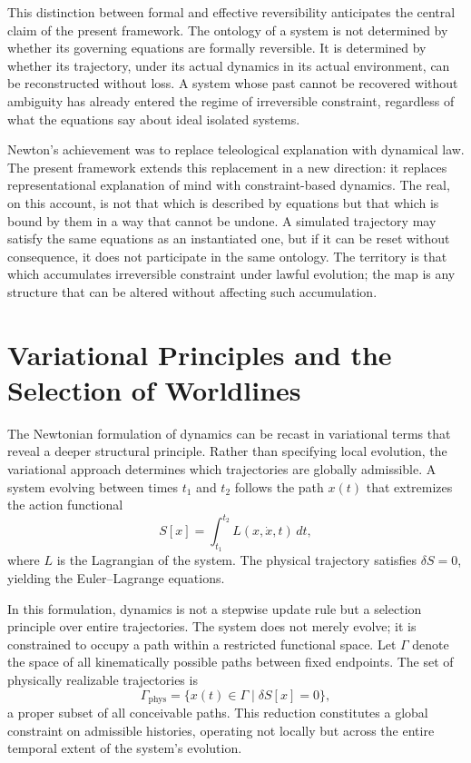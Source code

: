 \documentclass[11pt]{article}
\theoremstyle{definition}
\theoremstyle{remark}
\begin{document}
This distinction between formal and effective reversibility anticipates the central claim
of the present framework. The ontology of a system is not determined by whether its
governing equations are formally reversible. It is determined by whether its trajectory,
under its actual dynamics in its actual environment, can be reconstructed without loss. A
system whose past cannot be recovered without ambiguity has already entered the regime of
irreversible constraint, regardless of what the equations say about ideal isolated systems.

Newton's achievement was to replace teleological explanation with dynamical law. The present
framework extends this replacement in a new direction: it replaces representational
explanation of mind with constraint-based dynamics. The real, on this account, is not that
which is described by equations but that which is bound by them in a way that cannot be
undone. A simulated trajectory may satisfy the same equations as an instantiated one, but
if it can be reset without consequence, it does not participate in the same ontology. The
territory is that which accumulates irreversible constraint under lawful evolution; the map
is any structure that can be altered without affecting such accumulation.

\section{Variational Principles and the Selection of Worldlines}

The Newtonian formulation of dynamics can be recast in variational terms that reveal a
deeper structural principle. Rather than specifying local evolution, the variational
approach determines which trajectories are globally admissible. A system evolving between
times $t_1$ and $t_2$ follows the path $x(t)$ that extremizes the action functional
\[
S[x] = \int_{t_1}^{t_2} L(x, \dot{x}, t)\, dt,
\]
where $L$ is the Lagrangian of the system. The physical trajectory satisfies $\delta S = 0$,
yielding the Euler--Lagrange equations.

In this formulation, dynamics is not a stepwise update rule but a selection principle over
entire trajectories. The system does not merely evolve; it is constrained to occupy a path
within a restricted functional space. Let $\Gamma$ denote the space of all kinematically
possible paths between fixed endpoints. The set of physically realizable trajectories is
\[
\Gamma_{\text{phys}} = \{ x(t) \in \Gamma \mid \delta S[x] = 0 \},
\]
a proper subset of all conceivable paths. This reduction constitutes a global constraint on
admissible histories, operating not locally but across the entire temporal extent of the
system's evolution.
\end{document}
